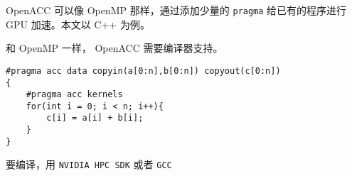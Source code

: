 
\begin{issues}
\issueDraft
\end{issues}

OpenACC 可以像 OpenMP 那样，通过添加少量的 \verb`pragma` 给已有的程序进行 GPU 加速。本文以 C++ 为例。

和 OpenMP 一样， OpenACC 需要编译器支持。

\begin{lstlisting}[language=none]
#pragma acc data copyin(a[0:n],b[0:n]) copyout(c[0:n])
{
    #pragma acc kernels 
    for(int i = 0; i < n; i++){
        c[i] = a[i] + b[i];
    }
}
\end{lstlisting}

要编译，用 \verb`NVIDIA HPC SDK` 或者 \verb`GCC`
